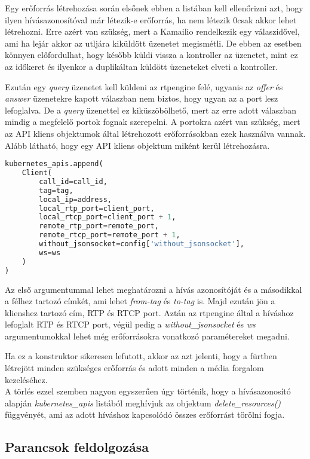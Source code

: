Egy erőforrás létrehozása során elsőnek ebben a listában kell ellenőrizni azt, hogy
ilyen hívásazonosítóval már létezik-e erőforrás, ha nem létezik 0csak akkor lehet létrehozni. 
Erre azért van szükség, mert a Kamailio rendelkezik egy válaszidővel, ami ha lejár
akkor az utljára kiküldött üzenetet megismétli. De ebben az esetben könnyen előfordulhat,
hogy később küldi vissza a kontroller az üzenetet, mint ez az időkeret és ilyenkor 
a duplikáltan küldött üzeneteket elveti a kontroller.

Ezután egy \textit{query} üzenetet kell küldeni az rtpengine felé, ugyanis az 
\textit{offer} és \textit{answer} üzenetekre kapott válaszban nem biztos, hogy ugyan
az a port lesz lefoglalva. De a \textit{query} üzenettel ez kiküszöbölhető, mert az 
erre adott válaszban mindig a megfelelő portok fognak szerepelni. A portokra azért van
szükség, mert az API kliens objektumok által létrehozott erőforrásokban ezek használva
vannak. Alább látható, hogy egy API kliens objektum miként kerül létrehozásra.

\begin{lstlisting}[language=python]
kubernetes_apis.append(
	Client(
		call_id=call_id,
		tag=tag,
		local_ip=address,
		local_rtp_port=client_port,
		local_rtcp_port=client_port + 1,
		remote_rtp_port=remote_port,
		remote_rtcp_port=remote_port + 1,
		without_jsonsocket=config['without_jsonsocket'],
		ws=ws
	)
)
\end{lstlisting}

Az első argumentummal lehet meghatározni a hívás azonosítóját és a másodikkal a félhez
tartozó címkét, ami lehet \textit{from-tag} és \textit{to-tag} is. Majd ezután jön a
klienshez tartozó cím, RTP és RTCP port. Aztán az rtpengine által a híváshoz lefoglalt
RTP és RTCP port, végül pedig a \textit{without\_jsonsocket} és \textit{ws} argumentumokkal
lehet még erőforrásokra vonatkozó paramétereket megadni.

Ha ez a konstruktor sikeresen lefutott, akkor az azt jelenti, hogy a fürtben létrejött
minden szükséges erőforrás és adott minden a média forgalom kezeléséhez. \\

A törlés ezzel szemben nagyon egyszerűen úgy történik, hogy a hívásazonosító alapján
\textit{kubernetes\_apis} listából meghívjuk az objektum \textit{delete\_resources()}
függvényét, ami az adott híváshoz kapcsolódó összes erőforrást törölni fogja.

\subsection{Parancsok feldolgozása}

